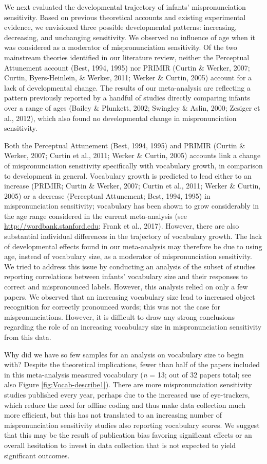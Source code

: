 \documentclass[man]{apa6}
\theoremstyle{definition}
\theoremstyle{definition}
\theoremstyle{definition}
\theoremstyle{remark}
\begin{document}
We next evaluated the developmental trajectory of infants'
mispronunciation sensitivity. Based on previous theoretical accounts and
existing experimental evidence, we envisioned three possible
developmental patterns: increasing, decreasing, and unchanging
sensitivity. We observed no influence of age when it was considered as a
moderator of mispronunciation sensitivity. Of the two mainstream
theories identified in our literature review, neither the Perceptual
Attunement account (Best, 1994, 1995) nor PRIMIR (Curtin \& Werker,
2007; Curtin, Byers-Heinlein, \& Werker, 2011; Werker \& Curtin, 2005)
account for a lack of developmental change. The results of our
meta-analysis are reflecting a pattern previously reported by a handful
of studies directly comparing infants over a range of ages (Bailey \&
Plunkett, 2002; Swingley \& Aslin, 2000; Zesiger et al., 2012), which
also found no developmental change in mispronunciation sensitivity.

Both the Perceptual Attunement (Best, 1994, 1995) and PRIMIR (Curtin \&
Werker, 2007; Curtin et al., 2011; Werker \& Curtin, 2005) accounts link
a change of mispronunciation sensitivity specifically with vocabulary
growth, in comparison to development in general. Vocabulary growth is
predicted to lead either to an increase (PRIMIR; Curtin \& Werker, 2007;
Curtin et al., 2011; Werker \& Curtin, 2005) or a decrease (Perceptual
Attunement; Best, 1994, 1995) in mispronunciation sensitivity;
vocabulary has been shown to grow considerably in the age range
considered in the current meta-analysis (see
\url{http://wordbank.stanford.edu}; Frank et al., 2017). However, there
are also substantial individual differences in the trajectory of
vocabulary growth. The lack of developmental effects found in our
meta-analysis may therefore be due to using age, instead of vocabulary
size, as a moderator of mispronunciation sensitivity. We tried to
address this issue by conducting an analysis of the subset of studies
reporting correlations between infants' vocabulary size and their
responses to correct and mispronounced labels. However, this analysis
relied on only a few papers. We observed that an increasing vocabulary
size lead to increased object recognition for correctly pronounced
words; this was not the case for mispronunciations. However, it is
difficult to draw any strong conclusions regarding the role of an
increasing vocabulary size in mispronunciation sensitivity from this
data.

Why did we have so few samples for an analysis on vocabulary size to
begin with? Despite the theoretical implications, fewer than half of the
papers included in this meta-analysis measured vocabulary (\emph{n} =
13; out of 32 papers total; see also Figure \ref{fig:Vocab-describe1}).
There are more mispronunciation sensitivity studies published every
year, perhaps due to the increased use of eye-trackers, which reduce the
need for offline coding and thus make data collection much more
efficient, but this has not translated to an increasing number of
mispronunciation sensitivity studies also reporting vocabulary scores.
We suggest that this may be the result of publication bias favoring
significant effects or an overall hesitation to invest in data
collection that is not expected to yield significant outcomes.
\end{document}
